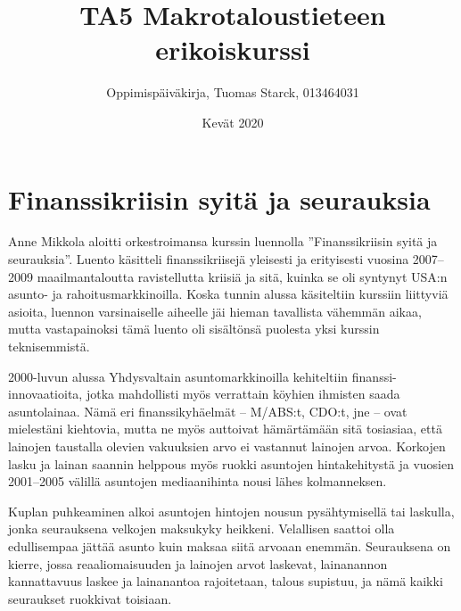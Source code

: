 \documentclass[12pt]{article}
\begin{document}
\title{TA5 Makrotaloustieteen erikoiskurssi}
\author{Oppimispäiväkirja, Tuomas Starck, 013464031}
\date{Kevät 2020}
\maketitle

%
%
%
%

\newpage
\section{Finanssikriisin syitä ja seurauksia}

Anne Mikkola aloitti orkestroimansa kurssin luennolla ''Finanssikriisin syitä ja seurauksia''. Luento käsitteli finanssikriisejä yleisesti ja erityisesti vuosina 2007–2009 maailmantaloutta ravistellutta kriisiä ja sitä, kuinka se oli syntynyt USA:n asunto- ja rahoitusmarkkinoilla. Koska tunnin alussa käsiteltiin kurssiin liittyviä asioita, luennon varsinaiselle aiheelle jäi hieman tavallista vähemmän aikaa, mutta vastapainoksi tämä luento oli sisältönsä puolesta yksi kurssin teknisemmistä.

2000-luvun alussa Yhdysvaltain asuntomarkkinoilla kehiteltiin finanssi-innovaatioita, jotka mahdollisti myös verrattain köyhien ihmisten saada asuntolainaa. Nämä eri finanssikyhäelmät – M/ABS:t, CDO:t, jne – ovat mielestäni kiehtovia, mutta ne myös auttoivat hämärtämään sitä tosiasiaa, että lainojen taustalla olevien vakuuksien arvo ei vastannut lainojen arvoa. Korkojen lasku ja lainan saannin helppous myös ruokki asuntojen hintakehitystä ja vuosien 2001–2005 välillä asuntojen mediaanihinta nousi lähes kolmanneksen.

Kuplan puhkeaminen alkoi asuntojen hintojen nousun pysähtymisellä tai laskulla, jonka seurauksena velkojen maksukyky heikkeni. Velallisen saattoi olla edullisempaa jättää asunto kuin maksaa siitä arvoaan enemmän. Seurauksena on kierre, jossa reaaliomaisuuden ja lainojen arvot laskevat, lainanannon kannattavuus laskee ja lainanantoa rajoitetaan, talous supistuu, ja nämä kaikki seuraukset ruokkivat toisiaan.
\end{document}
